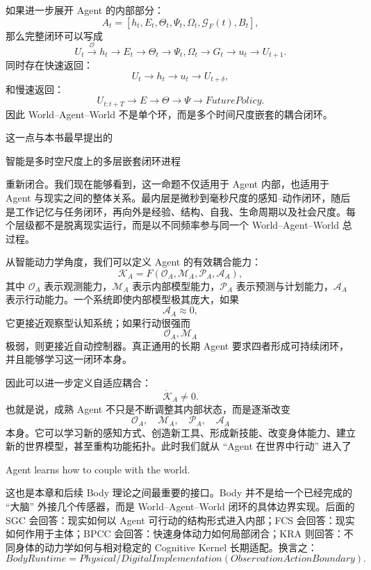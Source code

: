 如果进一步展开 Agent 的内部部分：
\[
A_t
=
\left[
h_t,
E_t,
\Theta_t,
\Psi_t,
\Omega_t,
\mathcal G_F(t),
B_t
\right],
\]
那么完整闭环可以写成
\[
U_t
\xrightarrow{\mathcal O}
h_t
\xrightarrow{}
E_t
\xrightarrow{}
\Theta_t
\xrightarrow{}
\Psi_t,\Omega_t
\xrightarrow{}
G_t
\xrightarrow{}
u_t
\xrightarrow{}
U_{t+1}.
\]
同时存在快速返回：
\[
U_t
\rightarrow
h_t
\rightarrow
u_t
\rightarrow
U_{t+\delta},
\]
和慢速返回：
\[
U_{t:t+T}
\rightarrow
E
\rightarrow
\Theta
\rightarrow
\Psi
\rightarrow
FuturePolicy.
\]
因此 World--Agent--World 不是单个环，而是多个时间尺度嵌套的耦合闭环。

这一点与本书最早提出的
\begin{statementbox}
智能是多时空尺度上的多层嵌套闭环进程
\end{statementbox}
重新闭合。我们现在能够看到，这一命题不仅适用于 Agent 内部，也适用于 Agent 与现实之间的整体关系。最内层是微秒到毫秒尺度的感知--动作闭环，随后是工作记忆与任务闭环，再向外是经验、结构、自我、生命周期以及社会尺度。每个层级都不是脱离现实运行，而是以不同频率参与同一个 World--Agent--World 总过程。

从智能动力学角度，我们可以定义 Agent 的有效耦合能力：
\[
\mathcal K_A
=
F
\left(
\mathcal O_A,
\mathcal M_A,
\mathcal P_A,
\mathcal A_A
\right),
\]
其中 $\mathcal O_A$ 表示观测能力，$\mathcal M_A$ 表示内部模型能力，$\mathcal P_A$ 表示预测与计划能力，$\mathcal A_A$ 表示行动能力。一个系统即使内部模型极其庞大，如果
\[
\mathcal A_A\approx 0,
\]
它更接近观察型认知系统；如果行动很强而
\[
\mathcal O_A,\mathcal M_A
\]
极弱，则更接近自动控制器。真正通用的长期 Agent 要求四者形成可持续闭环，并且能够学习这一闭环本身。

因此可以进一步定义自适应耦合：
\[
\dot{\mathcal K}_A
\neq
0.
\]
也就是说，成熟 Agent 不只是不断调整其内部状态，而是逐渐改变
\[
\mathcal O_A,\quad
\mathcal M_A,\quad
\mathcal P_A,\quad
\mathcal A_A
\]
本身。它可以学习新的感知方式、创造新工具、形成新技能、改变身体能力、建立新的世界模型，甚至重构功能拓扑。此时我们就从 ``Agent 在世界中行动'' 进入了
\begin{statementbox}
Agent learns how to couple with the world.
\end{statementbox}

这也是本章和后续 Body 理论之间最重要的接口。Body 并不是给一个已经完成的 ``大脑'' 外接几个传感器，而是 World--Agent--World 闭环的具体边界实现。后面的 SGC 会回答：现实如何以 Agent 可行动的结构形式进入内部；FCS 会回答：现实如何作用于主体；BPCC 会回答：快速身体动力如何局部闭合；KRA 则回答：不同身体的动力学如何与相对稳定的 Cognitive Kernel 长期适配。换言之：
\[
\boxed{
BodyRuntime
=
Physical/DigitalImplementation
\left(
ObservationActionBoundary
\right).
}
\]

